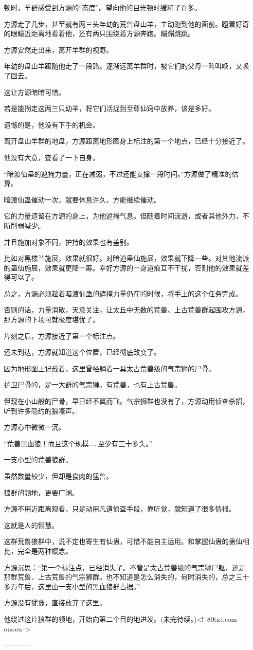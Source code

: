 \begin{this_body}
顿时，羊群感受到方源的“态度”。望向他的目光顿时缓和了许多。

方源走了几步，甚至就有两三头年幼的荒兽盘山羊，主动跑到他的面前。瞪着好奇的眼瞳近距离地看着他，还有两只围绕着方源奔跑。蹦蹦跳跳。

方源安然走出来，离开羊群的视野。

年幼的盘山羊跟随他走了一段路。逐渐远离羊群时，被它们的父母一阵叫唤，又唤了回去。

这让方源暗暗可惜。

若是能拐走这两三只幼羊，将它们活捉到至尊仙窍中放养，该是多好。

遗憾的是，他没有下手的机会。

离开盘山羊群的地盘，方源距离地形图身上标注的第一个地点，已经十分接近了。

他没有大意，查看了一下自身。

“暗渡仙蛊的遮掩力量，正在减弱，不过还能支撑一段时间。”方源做了精准的估算。

暗渡仙蛊催动一次，就要休息许久，方能继续催动。

它的力量遗留在方源的身上，为他遮掩气息。但随着时间流逝，或者其他外力，不断削弱减少。

并且施加对象不同，护持的效果也有差别。

比如对黑楼兰施展，效果就很好。对暗道蛊仙施展，效果就下降一些。对其他流派的蛊仙施展，效果就更降一筹。幸好方源的一身道痕互不干扰，否则他的效果就差得可以了。

总之，方源必须趁着暗渡仙蛊的遮掩力量仍在的时候，将手上的这个任务完成。

否则的话，力量消散，天意关注，让太丘中无数的荒兽、上古荒兽群起围攻方源，那方源的下场可就极度堪忧了。

片刻之后，方源接近了第一个标注点。

还未到达，方源就知道这个位置，已经彻底改变了。

因为地形图上记载着，这里曾经躺着一具太古荒兽级的气宗狮的尸骨。

护卫尸骨的，是一大群的气宗狮。有荒兽，也有上古荒兽。

但现在小山般的尸骨，早已经不翼而飞。气宗狮群也没有了，方源动用侦查杀招，听到许多隐约的狼嚎声。

方源心中微微一沉。

“荒兽黑血狼！而且这个规模……至少有三十多头。”

一支小型的荒兽狼群。

虽然数量较少，但却是食肉的猛兽。

狼群的领地，更要广阔。

方源不用近距离观看，只是动用凡道侦查手段，靠听觉，就知道了很多情报。

这就是人的智慧。

这群荒兽狼群中，说不定也寄生有仙蛊，可惜不能自主运用。和掌握仙蛊的蛊仙相比，完全是两种概念。

方源沉思：“第一个标注点，已经消失了。不管是太古荒兽级的气宗狮尸躯，还是那群荒兽、上古荒兽的气宗狮群。也不知道是怎么消失的，何时消失的，总之三十多万年后，这里由一支小型的黑血狼群占据。”

方源没有犹豫，直接放弃了这里。

他绕过这片狼群的领地，开始向第二个目的地进发。(未完待续。)<!--80txt.com-ouoou-->

------------

\end{this_body}

